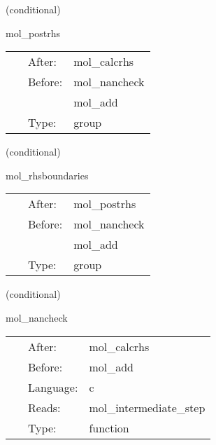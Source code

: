 \vspace{5mm}

   (conditional) 

\hspace{5mm} mol\_postrhs 

\hspace{5mm}{\it modify rhs functions } 


\hspace{5mm}

 \begin{tabular*}{160mm}{cll} 
~ & After:  & mol\_calcrhs \\ 
~ & Before:  & mol\_nancheck \\ 
~& ~ &mol\_add\\ 
~ & Type:  & group \\ 
\end{tabular*} 


\vspace{5mm}

   (conditional) 

\hspace{5mm} mol\_rhsboundaries 

\hspace{5mm}{\it any 'final' modifications to the rhs functions (boundaries etc.) } 


\hspace{5mm}

 \begin{tabular*}{160mm}{cll} 
~ & After:  & mol\_postrhs \\ 
~ & Before:  & mol\_nancheck \\ 
~& ~ &mol\_add\\ 
~ & Type:  & group \\ 
\end{tabular*} 


\vspace{5mm}

   (conditional) 

\hspace{5mm} mol\_nancheck 

\hspace{5mm}{\it check the rhs gfs for nans } 


\hspace{5mm}

 \begin{tabular*}{160mm}{cll} 
~ & After:  & mol\_calcrhs \\ 
~ & Before:  & mol\_add \\ 
~ & Language:  & c \\ 
~ & Reads:  & mol\_intermediate\_step \\ 
~ & Type:  & function \\ 
\end{tabular*} 


